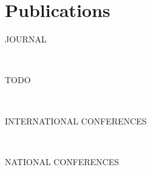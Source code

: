 \chapter*{Publications}


\begin{refsection}[ownpubs]

    \noindent JOURNAL
    \small
    
    \

    TODO

    \printbibliography[keyword=journal, heading=none]

    \

    \noindent INTERNATIONAL CONFERENCES
    \small
    \nocite{soule2024marl}
    \nocite{soulej2023sim}
    \printbibliography[keyword=international, heading=none]

    \

    \noindent NATIONAL CONFERENCES
    \nocite{soule2023jfsmathese}
    \nocite{soule2023ressithese}
    \nocite{soule2023rjciathese}
    \nocite{soule2024outil}
    \nocite{soule2024approche}
    \printbibliography[keyword=national, heading=none]

\end{refsection}
